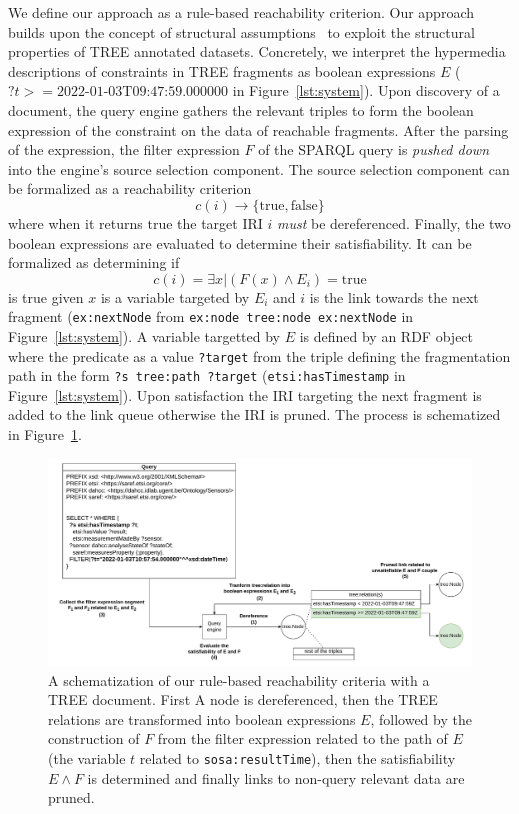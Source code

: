 We define our approach as a rule-based reachability criterion.
Our approach builds upon the concept of structural assumptions~\cite{taelman2023} to exploit the structural properties of TREE annotated datasets.
Concretely, we interpret the hypermedia descriptions of constraints in TREE fragments as boolean expressions $E$ ($?t>= \text{2022-01-03T09:47:59.000000}$ in Figure~\ref{lst:system}).
Upon discovery of a document, the query engine gathers the relevant triples to form the boolean expression of the constraint on the data of reachable fragments.
After the parsing of the expression, the filter expression $F$ of the SPARQL query is \textit{pushed down} into the engine's source selection component.
The source selection component can be formalized as a reachability criterion 
\begin{equation}
c(i) \rightarrow \{\mathrm{true}, \mathrm{false}\}
\end{equation}
where when it returns $\mathrm{true}$ the target IRI $i$ \emph{must} be dereferenced.
Finally, the two boolean expressions are evaluated to determine their satisfiability.
It can be formalized as determining if 
\begin{equation}
    c(i) = \exists x | (F(x) \land E_i) = \mathrm{true}
\end{equation}
is true given $x$ is a variable targeted by $E_i$ and $i$ is the link towards the next fragment (\texttt{ex:nextNode} from \texttt{ex:node tree:node ex:nextNode} in Figure~\ref{lst:system}).
A variable targetted by $E$ is defined by an RDF object where the predicate as a value \texttt{?target} from the triple
defining the fragmentation path in the form \texttt{?s tree:path ?target} (\texttt{etsi:hasTimestamp} in Figure~\ref{lst:system}).
Upon satisfaction the IRI targeting the next fragment is added to the link queue otherwise the IRI is pruned.
The process is schematized in Figure~\ref{fig:process}.

\begin{figure}[htbp]
    \centering
    \includegraphics[width=\linewidth]{image/running_example.drawio.pdf}
    \caption{A schematization of our rule-based reachability criteria with a TREE document.
     First A node is dereferenced, then the TREE relations are transformed into boolean expressions $E$,
      followed by the construction of $F$ from the filter expression related to the path of $E$ (the variable $t$ related to \texttt{sosa:resultTime}),
       then the satisfiability $E \land F$ is determined and finally links to non-query relevant data are pruned.}
    \label{fig:process}
  \end{figure}

